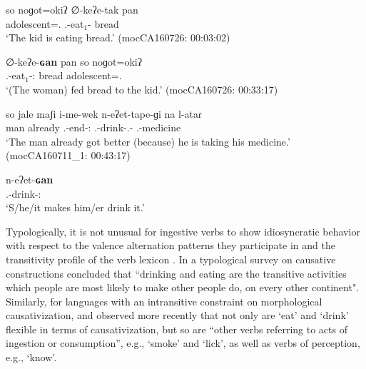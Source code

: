 \documentclass[12pt]{article}
\begin{document}
  \begin{exe}
\ex\label{ex:causeeat}
\begin{xlist}
\ex 
 \gll so noɡot=okiʔ ∅-keʔe-tak pan{\Sploan}   \\
			        {\DetTwo} adolescent={\Dim.\M} {\Third.\II}-eat$_1$-{\Prog} bread\\
	\trans `The kid is eating bread.'
	 \hfill (mocCA160726: 00:03:02)

	
\ex 
 \gll ∅-keʔe-\textbf{ɢan} pan{\Sploan} so noɡot=okiʔ\\
 {\Third.\II}-eat$_1$-{\Vm:\Tr} bread {\DetTwo} adolescent={\Dim.\M}\\
\trans `(The woman) fed bread to the kid.'
	  \hfill  (mocCA160726: 00:33:17) 
\end{xlist}
\end{exe}
  
  \begin{exe}
\ex \label{ex:causedrink}
\begin{xlist}
\ex 
 \gll so jale maʃi i-me-wek n-eʔet-tape-ɡi na l-ataɾ   \\
			       {\DetTwo} man already {\Third.\II}-end-{\Dir:\Out} {\Third.\III}-drink-{\Prog.\Pl}-{\LocFour} {\DetThree}  {\Third.\Poss}-medicine\\
	\trans `The man already got better (because) he is taking his medicine.' 
	\trans \hfill(mocCA160711\_1: 00:43:17)\label{ex:causedrinka}

\ex 
	 \gll n-eʔet-\textbf{ɢan} \\
{\Third.\III}-drink-{\Vm:\Tr}\\
	  \trans `S/he/it makes him/er drink it.'
	  \hfill \citep[][115]{Buckwalter1995}\label{ex:causedrinkb}
\end{xlist}
\end{exe}  
  
  
   Typologically, it is not unusual for ingestive verbs to show idiosyncratic behavior with respect to the valence alternation patterns they participate in and the transitivity profile of the verb lexicon \citep*[see][]{Nichols2004}. In a typological survey on causative constructions \citet[][63--65]{Dixon2000}  concluded that ``drinking and eating are the transitive activities which people are most likely to make other people do, on every other continent". Similarly, for languages with an intransitive constraint on morphological causativization, \citet[][30--31]{Naess2009} and \citet[][48--54]{Amberber2009} observed more recently that not only are `eat' and `drink' flexible in terms of causativization, but so are ``other verbs referring to acts of  ingestion or consumption'', e.g.,  `smoke' and `lick', as well as verbs of perception, e.g.,	 `know'.  
   
\end{document}
